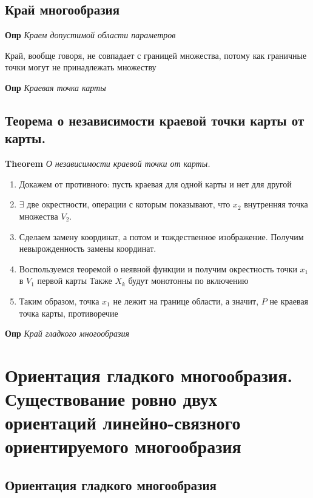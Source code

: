 \documentclass[a4paper, 14pt]{article}
\begin{document}
    \subsection{Край многообразия}
    
    \textbf{Опр} \textit{Краем допустимой области параметров}
    
    Край, вообще говоря, не совпадает с границей множества, потому как граничные точки могут не принадлежать множеству
    
    \textbf{Опр} \textit{Краевая точка карты}
    
    \subsection{Теорема о независимости краевой точки карты от карты.}
    
    \textbf{Theorem} \textit{О независимости краевой точки от карты.}
    
    \begin{enumerate}
        \item Докажем от противного: пусть краевая для одной карты и нет для другой
        \item $\exists$ две окрестности, операции с которым показывают, что $x_2$ внутренняя точка множества $V_2$.
        \item Сделаем замену координат, а потом и тождественное изображение.
        Получим невырожденность замены координат.
        \item Воспользуемся теоремой о неявной функции и получим окрестность точки $x_1$ в $V_1$ первой карты
        Также $X_k$ будут монотонны по включению
        \item Таким образом, точка $x_1$ не лежит на границе области, а значит, $P$ не краевая точка карты, противоречие
    \end{enumerate}
    
    \textbf{Опр} \textit{Край гладкого многообразия}
    
    \section{Ориентация гладкого многообразия.
    Существование ровно двух ориентаций линейно-связного ориентируемого многообразия}
    
    \subsection{Ориентация гладкого многообразия}
    
\end{document}
